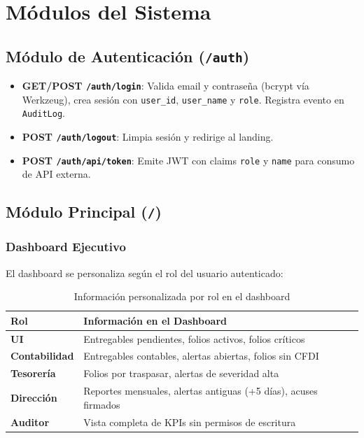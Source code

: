 \documentclass[12pt,a4paper]{article}
\begin{document}
\newpage

\section{M\'odulos del Sistema}

\subsection{M\'odulo de Autenticaci\'on (\texttt{/auth})}

\begin{itemize}
  \item \textbf{GET/POST \texttt{/auth/login}}: Valida email y contrase\~na (bcrypt v\'ia
    Werkzeug), crea sesi\'on con \texttt{user\_id}, \texttt{user\_name} y \texttt{role}.
    Registra evento en \texttt{AuditLog}.
  \item \textbf{POST \texttt{/auth/logout}}: Limpia sesi\'on y redirige al landing.
  \item \textbf{POST \texttt{/auth/api/token}}: Emite JWT con claims \texttt{role} y
    \texttt{name} para consumo de API externa.
\end{itemize}

\subsection{M\'odulo Principal (\texttt{/})}

\subsubsection{Dashboard Ejecutivo}

El dashboard se personaliza seg\'un el rol del usuario autenticado:

\begin{table}[h!]
\centering
\begin{tabularx}{\textwidth}{>{\bfseries}lX}
\toprule
Rol & Informaci\'on en el Dashboard \\
\midrule
UI & Entregables pendientes, folios activos, folios cr\'iticos \\
Contabilidad & Entregables contables, alertas abiertas, folios sin CFDI \\
Tesorer\'ia & Folios por traspasar, alertas de severidad alta \\
Direcci\'on & Reportes mensuales, alertas antiguas (+5 d\'ias), acuses firmados \\
Auditor & Vista completa de KPIs sin permisos de escritura \\
\bottomrule
\end{tabularx}
\caption{Informaci\'on personalizada por rol en el dashboard}
\end{table}
\end{document}
